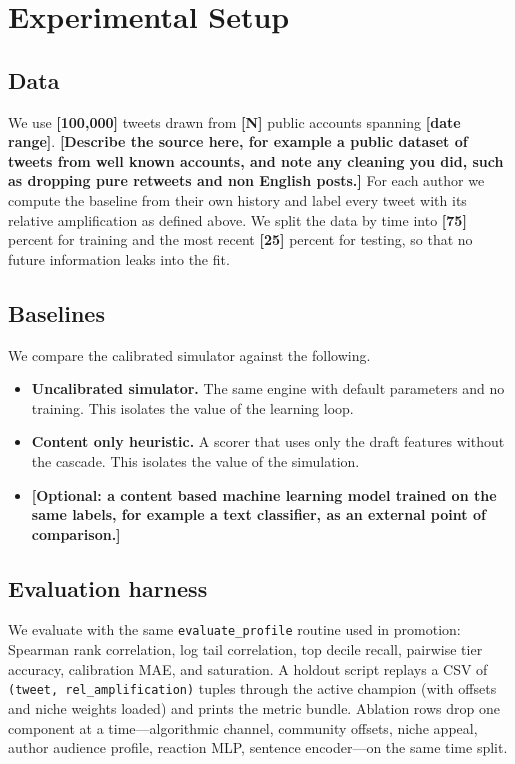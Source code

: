 \documentclass[11pt]{article}
\newcommand{\fill}[1]{\textbf{[#1]}}
\begin{document}
\section{Experimental Setup}
\label{sec:exp-setup}

\subsection{Data}
We use \fill{100{,}000} tweets drawn from \fill{N} public accounts spanning
\fill{date range}. \fill{Describe the source here, for example a public dataset
of tweets from well known accounts, and note any cleaning you did, such as
dropping pure retweets and non English posts.} For each author we compute the
baseline from their own history and label every tweet with its relative
amplification as defined above. We split the data by time into \fill{75} percent
for training and the most recent \fill{25} percent for testing, so that no future
information leaks into the fit.

\subsection{Baselines}
We compare the calibrated simulator against the following.
\begin{itemize}
  \item \textbf{Uncalibrated simulator.} The same engine with default
  parameters and no training. This isolates the value of the learning loop.
  \item \textbf{Content only heuristic.} A scorer that uses only the draft
  features without the cascade. This isolates the value of the simulation.
  \item \fill{Optional: a content based machine learning model trained on the
  same labels, for example a text classifier, as an external point of
  comparison.}
\end{itemize}

\subsection{Evaluation harness}
We evaluate with the same \texttt{evaluate\_profile} routine used in promotion:
Spearman rank correlation, log tail correlation, top decile recall, pairwise tier
accuracy, calibration MAE, and saturation. A holdout script replays a CSV of
\texttt{(tweet, rel\_amplification)} tuples through the active champion (with
offsets and niche weights loaded) and prints the metric bundle. Ablation rows
drop one component at a time---algorithmic channel, community offsets, niche
appeal, author audience profile, reaction MLP, sentence encoder---on the same
time split.
\end{document}

